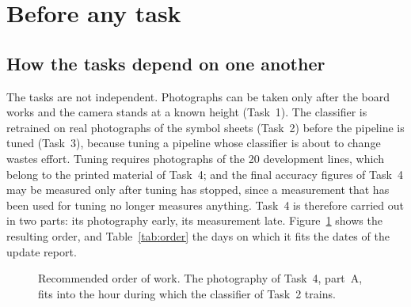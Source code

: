 \section{Before any task}
\label{sec:before}

\subsection{How the tasks depend on one another}

The tasks are not independent. Photographs can be taken only after the board works and the
camera stands at a known height (Task~1). The classifier is retrained on real photographs of
the symbol sheets (Task~2) before the pipeline is tuned (Task~3), because tuning a pipeline
whose classifier is about to change wastes effort. Tuning requires photographs of the 20
development lines, which belong to the printed material of Task~4; and the final accuracy
figures of Task~4 may be measured only after tuning has stopped, since a measurement that has
been used for tuning no longer measures anything. Task~4 is therefore carried out in two parts:
its photography early, its measurement late. Figure~\ref{fig:order} shows the resulting order,
and Table~\ref{tab:order} the days on which it fits the dates of the update report.

\begin{figure}[H]
\centering
{}
\caption{Recommended order of work. The photography of Task~4, part~A, fits into the hour
during which the classifier of Task~2 trains.}
\label{fig:order}
\end{figure}

